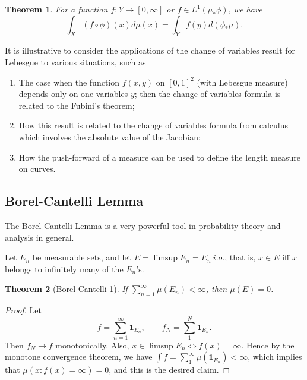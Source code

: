 \documentclass{article}
\newtheorem{theorem}{Theorem}[section]
\theoremstyle{definition}
\begin{document}
\begin{theorem}
	For a function $f:Y\rightarrow [0,\infty]$ or $f\in L^1(\mu_*\phi)$, we have
	\begin{equation*}
		\int_{X} (f\circ \phi)(x) d\mu(x) = \int_{Y} f(y) d(\phi_{*}\mu).
	\end{equation*}
\end{theorem}

It is illustrative to consider the applications of the change of variables
result for Lebesgue to various situations, such as
\begin{enumerate}[1.]
	\item The case when the function $f(x,y)$ on $[0,1]^2$ (with Lebesgue measure)
		depends only on one variables $y$; then the change of variables formula
		is related to the Fubini's theorem;
	\item How this result is related to the change of variables formula
		from calculus which involves the absolute value of the Jacobian;
	\item How the push-forward of a measure can be used to define the length
		measure on curves.
\end{enumerate}

\subsection{Borel-Cantelli Lemma}

The Borel-Cantelli Lemma is a very powerful tool in probability theory and 
analysis in general.

Let $E_{n}$ be measurable sets, and let $E=\limsup E_n = E_{n} \ i.o.$,
that is, $x\in E$ iff $x$ belongs to infinitely many of the $E_n$'s.

\begin{theorem}[Borel-Cantelli 1]
	If $\sum_{n=1}^{\infty} \mu(E_n) < \infty$, then $\mu(E)=0$.
\end{theorem}
\begin{proof}
	Let 
	$$f=\sum_{n=1}^{\infty}\mathbf{1}_{E_n},\qquad  f_N=\sum_{1}^{N}\mathbf{1}_{E_n}.$$
	Then $f_N\rightarrow f$ monotonically.
	Also, $x\in \limsup{E_n} \Leftrightarrow f(x)=\infty$.
	Hence by the monotone convergence theorem, we have
	$\int f = \sum_{1}^{\infty} \mu(\mathbf{1}_{E_n})<\infty$, which implies that 
	$\mu(x:f(x)=\infty)=0$, and this is the desired claim.
\end{proof}
\end{document}
